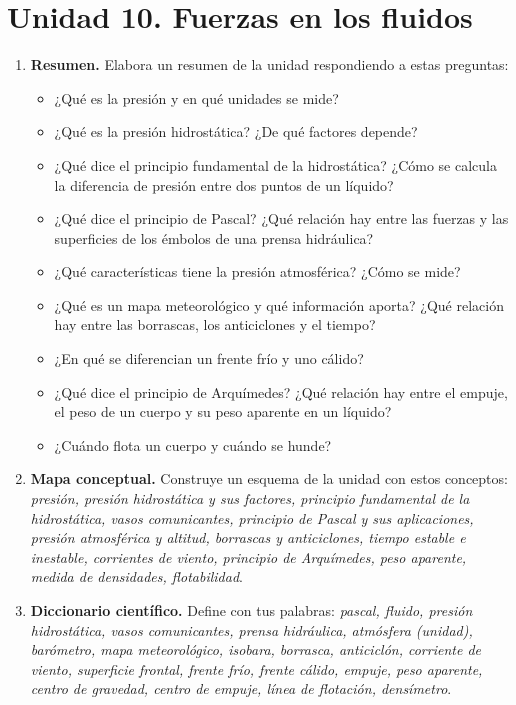 \section{Unidad 10. Fuerzas en los fluidos}

\begin{enumerate}[label=\numberballred]
    \item \textbf{Resumen.} Elabora un resumen de la unidad respondiendo a estas preguntas:
    \begin{itemize}
        \item ¿Qué es la presión y en qué unidades se mide?
        \item ¿Qué es la presión hidrostática? ¿De qué factores depende?
        \item ¿Qué dice el principio fundamental de la hidrostática? ¿Cómo se calcula la diferencia de presión entre dos puntos de un líquido?
        \item ¿Qué dice el principio de Pascal? ¿Qué relación hay entre las fuerzas y las superficies de los émbolos de una prensa hidráulica?
        \item ¿Qué características tiene la presión atmosférica? ¿Cómo se mide?
        \item ¿Qué es un mapa meteorológico y qué información aporta? ¿Qué relación hay entre las borrascas, los anticiclones y el tiempo?
        \item ¿En qué se diferencian un frente frío y uno cálido?
        \item ¿Qué dice el principio de Arquímedes? ¿Qué relación hay entre el empuje, el peso de un cuerpo y su peso aparente en un líquido?
        \item ¿Cuándo flota un cuerpo y cuándo se hunde?
    \end{itemize}
    \item \textbf{Mapa conceptual.} Construye un esquema de la unidad con estos conceptos: \emph{presión, presión hidrostática y sus factores, principio fundamental de la hidrostática, vasos comunicantes, principio de Pascal y sus aplicaciones, presión atmosférica y altitud, borrascas y anticiclones, tiempo estable e inestable, corrientes de viento, principio de Arquímedes, peso aparente, medida de densidades, flotabilidad}.
    \item \textbf{Diccionario científico.} Define con tus palabras: \emph{pascal, fluido, presión hidrostática, vasos comunicantes, prensa hidráulica, atmósfera (unidad), barómetro, mapa meteorológico, isobara, borrasca, anticiclón, corriente de viento, superficie frontal, frente frío, frente cálido, empuje, peso aparente, centro de gravedad, centro de empuje, línea de flotación, densímetro}.
\end{enumerate}

